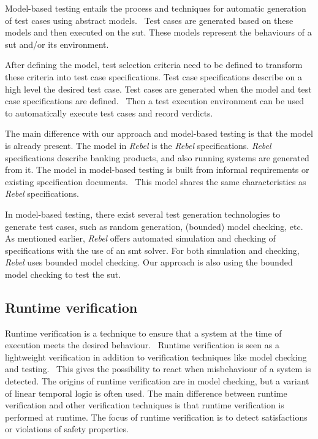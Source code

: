 Model-based testing entails the process and techniques for automatic generation
of test cases using abstract models.~\cite{utting2012taxonomy, tretmans2008model, dalal1999model}
Test cases are generated based on these models and then executed on the
\gls{sut}. These models represent the behaviours of a \gls{sut} and/or its
environment.~\cite{utting2012taxonomy, tretmans2008model}

After defining the model, test selection criteria need to be defined to
transform these criteria into test case specifications. Test case specifications
describe on a high level the desired test case. Test cases are generated when
the model and test case specifications are defined.~\cite{utting2012taxonomy}
Then a test execution environment can be used to automatically execute test
cases and record verdicts.

The main difference with our approach and model-based testing is that the model
is already present. The model in \textit{Rebel} is the \textit{Rebel}
specifications. \textit{Rebel} specifications describe banking products, and
also running systems are generated from it. The model in model-based testing is
built from informal requirements or existing specification
documents.~\cite[p.~2]{utting2012taxonomy} This model
shares the same characteristics as \textit{Rebel} specifications.

In model-based testing, there exist several test generation technologies to
generate test cases, such as random generation, (bounded) model checking,
etc.~\cite[p.~8-9]{utting2012taxonomy}
As mentioned earlier, \textit{Rebel} offers automated simulation and checking of
specifications with the use of an \gls{smt} solver. For both simulation and
checking, \textit{Rebel} uses bounded model checking. Our approach is also using
the bounded model checking to test the \gls{sut}.

\subsection*{Runtime verification}

Runtime verification is a technique to ensure that a system at the time of
execution meets the desired
behaviour.~\cite{leucker2009brief, havelund2008verify, falcone2009runtime}
Runtime verification is seen as a lightweight verification in addition to
verification techniques like model checking and
testing.~\cite[p.~294]{leucker2009brief} This gives the possibility to react
when misbehaviour of a system is detected. The origins of runtime verification
are in model checking, but a variant of linear temporal logic is often used.
The main difference between runtime verification and other verification
techniques is that runtime verification is performed at runtime.
The focus of runtime verification is to detect satisfactions or violations of
safety properties.~\cite{leucker2009brief, falcone2009runtime}

